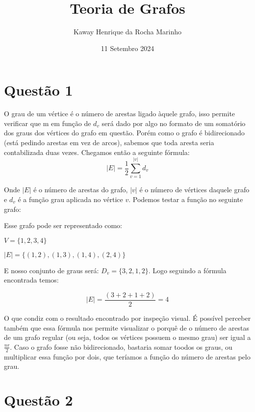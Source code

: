 \documentclass{article}
\title{Teoria de Grafos}
\author{Kaway Henrique da Rocha Marinho }
\date{11 Setembro 2024}
\begin{document}
\maketitle

\section{Questão 1}

O grau de um vértice é o número de arestas ligado àquele grafo, isso permite verificar que m em função de ${d_v}$ será dado por algo no formato de um somatório dos graus dos vértices do grafo em questão. Porém como o grafo é bidirecionado (está pedindo arestas em vez de arcos), sabemos que toda aresta seria contabilizada duas vezes. Chegamos então a seguinte fórmula:
\[|E| = \frac{1}{2} \sum_{v=1}^{|v|} d_v\]

Onde ${|E|}$ é o número de arestas do grafo, ${|v|}$ é o número de vértices daquele grafo e ${d_v}$ é a função grau aplicada no vértice ${v}$.
\smallbreak
Podemos testar a função no seguinte grafo:
\smallbreak
{}

Esse grafo pode ser representado como:

${V = \{1, 2, 3, 4\}}$

${|E| = \{ (1, 2), (1, 3), (1,4), (2,4)\}}$

E nosso conjunto de graus será: ${D_v = \{3, 2, 1, 2\}}$. Logo seguindo a fórmula encontrada temos:

\[|E| = \frac{(3 + 2 + 1 + 2)}{2} = 4\]

O que condiz com o resultado encontrado por inspeção visual. É possível perceber também que essa fórmula nos permite visualizar o porquê de o número de arestas de um grafo regular (ou seja, todos os vértices possuem o mesmo grau) ser igual a ${\frac{nr}{2}}$. Caso o grafo fosse não bidirecionado, bastaria somar toodos os graus, ou multiplicar essa função por dois, que teríamos a função do número de arestas pelo grau.

\smallbreak
\section{Questão 2}
\end{document}
